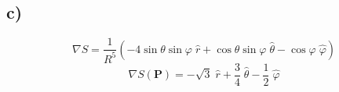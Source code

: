 \documentclass[12pt]{article}
\begin{document}
	\subsection{c)}
	\begin{equation}
		\nabla S = \frac1{R^5} \left( -4 \sin{\theta} \sin{\varphi} \; \hat{r} + \cos{\theta}\sin{\varphi} \; \hat{\theta} - \cos{\varphi}  \; \hat{\varphi} \right)
	\end{equation}
	\begin{equation}
		\nabla S(\textbf{P}) = -\sqrt{3} \; \hat{r} +  \frac34 \; \hat{\theta} - \frac12  \; \hat{\varphi}
	\end{equation}
\end{document}
